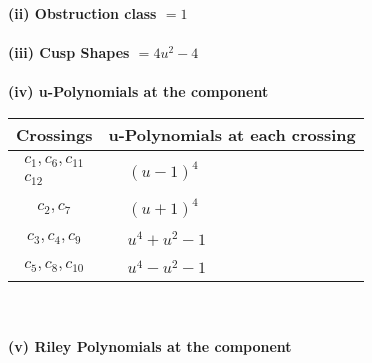 \documentclass[1p]{elsarticle_modified}
\theoremstyle{definition}
\begin{document}
\flushleft \textbf{(ii) Obstruction class $= 1$}\\~\\
\flushleft \textbf{(iii) Cusp Shapes $= 4 u^2-4$}\\~\\
\newpage\renewcommand{\arraystretch}{1}
\flushleft \textbf{(iv) u-Polynomials at the component}\newline \\
\begin{tabular}{m{50pt}|m{274pt}}
Crossings & \hspace{64pt}u-Polynomials at each crossing \\
\hline $$\begin{aligned}c_{1},c_{6},c_{11}\\c_{12}\end{aligned}$$&$\begin{aligned}
&(u-1)^4
\end{aligned}$\\
\hline $$\begin{aligned}c_{2},c_{7}\end{aligned}$$&$\begin{aligned}
&(u+1)^4
\end{aligned}$\\
\hline $$\begin{aligned}c_{3},c_{4},c_{9}\end{aligned}$$&$\begin{aligned}
&u^4+u^2-1
\end{aligned}$\\
\hline $$\begin{aligned}c_{5},c_{8},c_{10}\end{aligned}$$&$\begin{aligned}
&u^4- u^2-1
\end{aligned}$\\
\hline
\end{tabular}\\~\\
\newpage\renewcommand{\arraystretch}{1}
\flushleft \textbf{(v) Riley Polynomials at the component}\newline \\
\end{document}
